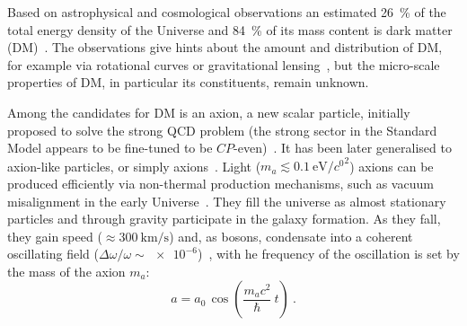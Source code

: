








Based on astrophysical and cosmological observations an estimated \SI{26}{\percent} of the total energy density of the Universe and \SI{84}{\percent} of its mass content is dark matter (DM)~\cite{Planck2015}. The observations give hints about the amount and distribution of DM, for example via rotational curves or gravitational lensing~\cite{ApJ1990}, but the micro-scale properties of DM, in particular its constituents, remain unknown.

Among the candidates for DM is an axion, a new scalar particle, initially proposed to solve the strong QCD problem (the strong sector in the Standard Model appears to be fine-tuned to be $CP$-even)~\cite{PhysRevLett.38.1440,PQ1977B,Weinberg1978,Wilczek1978,Kim1979,Zakharov1980,Zhitnitsky1980B,Srednicki1981}. 
It has been later generalised to axion-like particles, or simply axions~\cite{Witten1984,Conlon2006,Witten2006,Arvanitaki2010,Arias2012,Marsh2015Review}. Light ($m_a \lesssim \SI[per-mode=symbol]{0.1}{\electronvolt\per\clight\squared}$) axions can be produced efficiently via non-thermal production mechanisms, such as vacuum misalignment in the early Universe~\cite{Preskill1983cosmo,Sikivie1983cosmo,Dine1983cosmo}. They fill the universe as almost stationary particles and through gravity participate in the galaxy formation. As they fall, they gain speed ($\approx \SI[per-mode=symbol]{300}{\kilo\metre\per\second}$) and, as bosons, condensate into a coherent oscillating field ($\Delta\omega / \omega \sim \num{e-6}$)~\cite{Marsh2015Review}, with he frequency of the oscillation is set by the mass of the axion $m_a$:
\begin{equation}
  a = a_0 \, \cos\left(\frac{ m_a c^2 }{\hbar} \ t\right) \ .
\end{equation}

